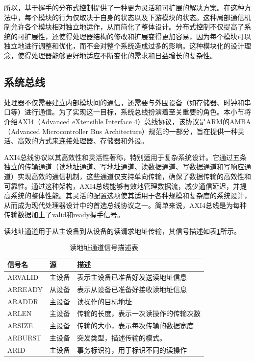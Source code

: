 所以，基于握手的分布式控制提供了一种更为灵活和可扩展的解决方案。在这种方法中，每个模块的行为仅取决于自身的状态以及下游模块的状态。这种局部通信机制允许各个模块相对独立地运作，从而简化了整体设计。分布式控制不仅提高了系统的可扩展性，还使得处理器结构的修改和扩展变得更加容易，因为每个模块可以独立地进行调整和优化，而不会对整个系统造成过多的影响。这种模块化的设计理念，使得处理器能够更好地适应不断变化的需求和日益增长的复杂性。

\subsection{系统总线}
处理器不仅需要建立内部模块间的通信，还需要与外围设备（如存储器、时钟和串口等）进行通信。为了实现这一目标，系统总线扮演着至关重要的角色。本小节将介绍AXI4（Advanced eXtensible Interface 4）总线协议，该协议是ARM的AMBA（Advanced Microcontroller Bus Architecture）规范的一部分\cite{amba2011axi}，旨在提供一种灵活、高效的方式来连接处理器、存储器和外设。

AXI4总线协议以其高效性和灵活性著称，特别适用于复杂系统设计。它通过五条独立的传输通道（读地址通道、写地址通道、读数据通道、写数据通道和写响应通道）实现高效的通信机制，这些通道仅支持单向传输，确保了数据传输的高效性和可靠性。通过这种架构，AXI4总线能够有效地管理数据流，减少通信延迟，并提高系统的整体性能。其灵活的配置选项使其适用于各种规模和复杂度的系统设计，从而成为现代处理器设计中的首选总线协议之一。简单来说，AXI4总线是为每种传输数据加上了valid和ready握手信号。

读地址通道用于从主设备到从设备的读请求地址传输，其信号描述如表\ref{tab:read_address_bus}所示。

\begin{table}[H]
	\centering
	\caption{读地址通道信号描述表}
	\begin{tabularx}{\textwidth}{>{\centering\arraybackslash}p{4cm} >{\centering\arraybackslash}p{3cm} >{\centering\arraybackslash}X}
		\toprule
		\textbf{信号名} & \textbf{源} & \textbf{描述}        \\
		\midrule
		ARVALID      & 主设备        & 表示主设备已准备好发送读地址信息   \\
		ARREADY      & 从设备        & 表示从设备已准备好接收读地址信息   \\
		ARADDR       & 主设备        & 读操作的目标地址           \\
		ARLEN        & 主设备        & 传输的长度，表示一次读操作的传输次数 \\
		ARSIZE       & 主设备        & 传输的大小，表示每次传输的数据宽度  \\
		ARBURST      & 主设备        & 突发类型，描述传输的模式。      \\
		ARID         & 主设备        & 事务标识符，用于标识不同的读操作   \\
		\bottomrule
	\end{tabularx}
	\label{tab:read_address_bus}
\end{table}

